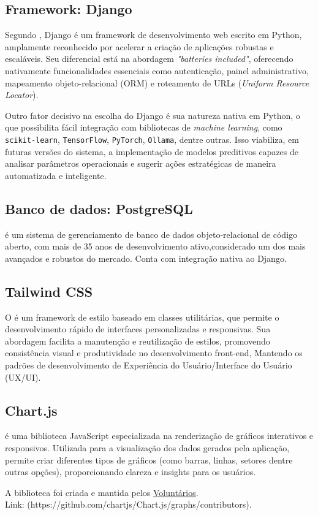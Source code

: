 \subsection{Framework: Django}
\par Segundo , Django é um framework de desenvolvimento web escrito em Python, amplamente reconhecido por acelerar a criação de aplicações robustas e escaláveis. Seu diferencial está na abordagem \textit{"batteries included"}, oferecendo nativamente funcionalidades essenciais como autenticação, painel administrativo, mapeamento objeto-relacional (ORM) e roteamento de URLs (\textit{Uniform Resource Locator}).
\par Outro fator decisivo na escolha do Django é sua natureza nativa em Python, o que possibilita fácil integração com bibliotecas de \textit{machine learning}, como \texttt{scikit-learn}, \texttt{TensorFlow}, \texttt{PyTorch}, \texttt{Ollama}, dentre outras. Isso viabiliza, em futuras versões do sistema, a implementação de modelos preditivos capazes de analisar parâmetros operacionais e sugerir ações estratégicas de maneira automatizada e inteligente.

\subsection{Banco de dados: PostgreSQL}
\par {} é um sistema de gerenciamento de banco de dados objeto-relacional de código aberto, com mais de 35 anos de desenvolvimento ativo,considerado um dos mais avançados e robustos do mercado. Conta com integração nativa ao Django.

\subsection{Tailwind CSS}
\par O  é um framework de estilo baseado em classes utilitárias, que permite o desenvolvimento rápido de interfaces personalizadas e responsivas. Sua abordagem facilita a manutenção e reutilização de estilos, promovendo consistência visual e produtividade no desenvolvimento front-end, Mantendo os padrões de desenvolvimento de Experiência do Usuário/Interface do Usuário (UX/UI).

\subsection{Chart.js}
\par {} é uma biblioteca JavaScript especializada na renderização de gráficos interativos e responsivos. Utilizada para a visualização dos dados gerados pela aplicação, permite criar diferentes tipos de gráficos (como barras, linhas, setores dentre outras opções), proporcionando clareza e insights para os usuários.
\par A biblioteca foi criada e mantida pelos \href{https://github.com/chartjs/Chart.js/graphs/contributors}{Voluntários}. \\
Link: (https://github.com/chartjs/Chart.js/graphs/contributors).


